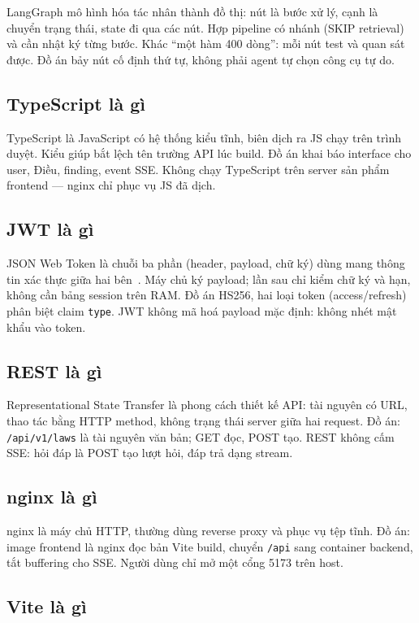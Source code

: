 LangGraph mô hình hóa tác nhân thành đồ thị: nút là bước xử lý, cạnh là chuyển
trạng thái, state đi qua các nút. Hợp pipeline có nhánh (SKIP retrieval) và cần
nhật ký từng bước. Khác ``một hàm 400 dòng'': mỗi nút test và quan sát được.
Đồ án bảy nút cố định thứ tự, không phải agent tự chọn công cụ tự do.

\subsection{TypeScript là gì}

TypeScript là JavaScript có hệ thống kiểu tĩnh, biên dịch ra JS chạy trên trình
duyệt. Kiểu giúp bắt lệch tên trường API lúc build. Đồ án khai báo interface
cho user, Điều, finding, event SSE. Không chạy TypeScript trên server sản phẩm
frontend --- nginx chỉ phục vụ JS đã dịch.

\subsection{JWT là gì}

JSON Web Token là chuỗi ba phần (header, payload, chữ ký) dùng mang thông tin
xác thực giữa hai bên~\cite{rfc7519}. Máy chủ ký payload; lần sau chỉ kiểm chữ
ký và hạn, không cần bảng session trên RAM. Đồ án HS256, hai loại token
(access/refresh) phân biệt claim \texttt{type}. JWT không mã hoá payload mặc
định: không nhét mật khẩu vào token.

\subsection{REST là gì}

Representational State Transfer là phong cách thiết kế API: tài nguyên có URL,
thao tác bằng HTTP method, không trạng thái server giữa hai request. Đồ án:
\texttt{/api/v1/laws} là tài nguyên văn bản; GET đọc, POST tạo. REST không cấm
SSE: hỏi đáp là POST tạo lượt hỏi, đáp trả dạng stream.

\subsection{nginx là gì}

nginx là máy chủ HTTP, thường dùng reverse proxy và phục vụ tệp tĩnh. Đồ án:
image frontend là nginx đọc bản Vite build, chuyển \texttt{/api} sang container
backend, tắt buffering cho SSE. Người dùng chỉ mở một cổng 5173 trên host.

\subsection{Vite là gì}

